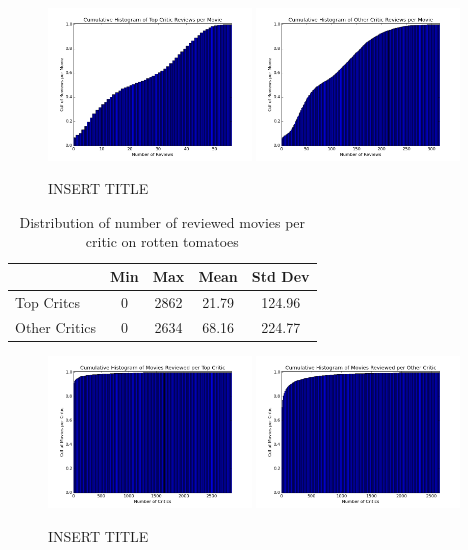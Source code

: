 \documentclass[12pt]{article}
\begin{document}
	\begin{figure}[H]
	    \centering
	    \includegraphics[width=0.48\textwidth]{plots/plot_r_mov_top.png}
	    \includegraphics[width=0.48\textwidth]{plots/plot_r_mov_oth.png}
	    \caption{INSERT TITLE}
	    \label{fig:r_mov}
	\end{figure}


	\begin{table}[H]
	 \centering
	 \caption{Distribution of number of reviewed movies per critic on rotten tomatoes} 
	 \begin{tabular}{ l | c | c | c | c }
	 \hline
	 &  Min & Max & Mean & Std Dev  \\
	 \hline
	 Top Critcs & 0 & 2862 & 21.79 & 124.96 \\
	 Other Critics & 0 & 2634 & 68.16 & 224.77 \\
	 \hline
	 \end{tabular}
	 \end{table}

	\begin{figure}[H]
	    \centering
	    \includegraphics[width=0.48\textwidth]{plots/plot_r_crit_top.png}
	    \includegraphics[width=0.48\textwidth]{plots/plot_r_crit_oth.png}
	    \caption{INSERT TITLE}
	    \label{fig:r_crit}
	\end{figure}
\end{document}
